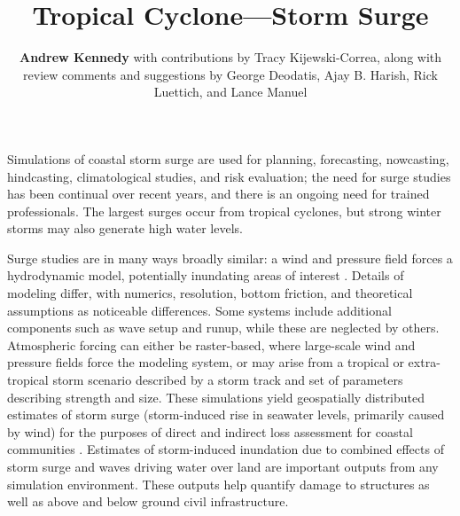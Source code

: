 %
%
%

\title{Tropical Cyclone---Storm Surge}
\author{
    \textbf{Andrew Kennedy}
    with contributions by Tracy Kijewski-Correa,
    \newline
    along with review comments and suggestions by George Deodatis, Ajay B. Harish, Rick Luettich, and Lance Manuel
}
\tocauthor{}
%
%
\maketitle

Simulations of coastal storm surge are used for planning, forecasting, nowcasting, hindcasting, climatological studies, and risk evaluation; the need for surge studies has been continual over recent years, and there is an ongoing need for trained professionals. The largest surges occur from tropical cyclones, but strong winter storms may also generate high water levels.

Surge studies are in many ways broadly similar: a wind and pressure field forces a hydrodynamic model, potentially inundating areas of interest \citep{njcoast2018implementation}. Details of modeling differ, with numerics, resolution, bottom friction, and theoretical assumptions as noticeable differences. Some systems include additional components such as wave setup and runup, while these are neglected by others. Atmospheric forcing can either be raster-based, where large-scale wind and pressure fields force the modeling system, or may arise from a tropical or extra-tropical storm scenario described by a storm track and set of parameters describing strength and size. These simulations yield geospatially distributed estimates of storm surge (storm-induced rise in seawater levels, primarily caused by wind) for the purposes of direct and indirect loss assessment for coastal communities \citep{jacob2011responding}. Estimates of storm-induced inundation due to combined effects of storm surge and waves driving water over land are important outputs from any simulation environment. These outputs help quantify damage to structures as well as above and below ground civil infrastructure.

